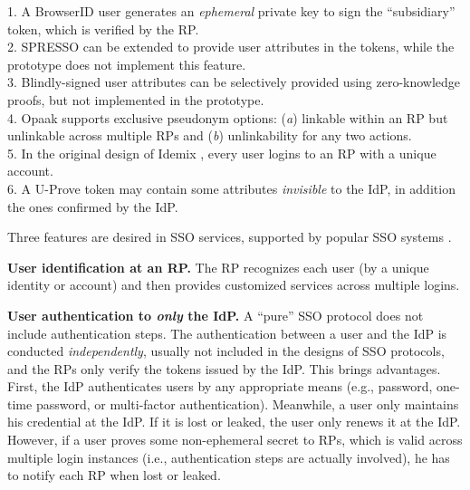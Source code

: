 \begin{table}[tb]
\flushleft
{\footnotesize
1. A BrowserID user generates an \emph{ephemeral} private key to sign the ``subsidiary'' token,
 which is verified by the RP.\\
2. SPRESSO can be extended to provide user attributes in the tokens, while the prototype does not implement this feature.\\
3. Blindly-signed user attributes can be selectively provided using zero-knowledge proofs,
    but not implemented in the prototype.\\
4. Opaak supports exclusive pseudonym options: (\emph{a}) linkable within an RP but unlinkable across multiple RPs and (\emph{b}) unlinkability for any two actions.\\
5. In the original design of Idemix \cite{idemix}, every user logins to an RP with a unique account.\\
6. A U-Prove token may contain some attributes \emph{invisible} to the IdP, in addition the ones confirmed by the IdP.}
\end{table}

Three features are desired in SSO services, supported by popular SSO systems \cite{NIST2017draft,OpenIDConnect,rfc6749,SAML,SAMLIdentifier}.

\noindent \textbf{User identification at an RP.}
The RP recognizes each user (by a unique identity or account) and then provides customized services across multiple logins.


\noindent\textbf{User authentication to {\em only} the IdP.}
A ``pure'' SSO protocol \cite{OpenIDConnect,rfc6749,SAML} does not include authentication steps. The authentication between a user and the IdP is conducted \emph{independently},
    usually not included in the designs of SSO protocols,
and the RPs only verify the tokens issued by the IdP.
This brings advantages. First, the IdP authenticates users by any appropriate means (e.g., password,
one-time password, or multi-factor authentication).
Meanwhile, a user only maintains his credential at the IdP. If it is lost or leaked, the user only renews it at the IdP. However, if a user proves some non-ephemeral secret to RPs, which is valid across multiple login instances (i.e., authentication steps are actually involved), he has to notify each RP when lost or leaked. %

